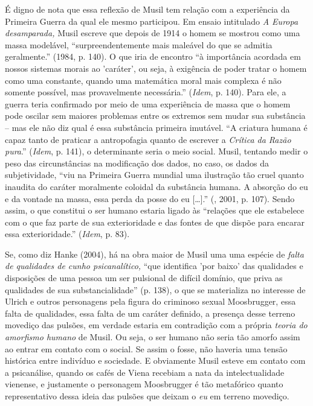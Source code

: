É digno de nota que essa reflexão de Musil tem relação com a experiência
da Primeira Guerra da qual ele mesmo participou. Em ensaio intitulado
\emph{A Europa desamparada,} Musil escreve que depois de 1914 o homem se
mostrou como uma massa modelável, ``surpreendentemente mais maleável do
que se admitia geralmente.'' (1984, p. 140). O que iria de encontro ``à
importância acordada em nossos sistemas morais ao 'caráter', ou seja, à
exigência de poder tratar o homem como uma constante, quando uma
matemática moral mais complexa é não somente possível, mas provavelmente
necessária.'' (\emph{Idem}, p. 140). Para ele, a guerra teria confirmado
por meio de uma experiência de massa que o homem pode oscilar sem
maiores problemas entre os extremos sem mudar sua substância -- mas ele
não diz qual é essa substância primeira imutável. ``A criatura humana é
capaz tanto de praticar a antropofagia quanto de escrever a
\emph{Crítica da Razão pura}.'' (\emph{Idem}, p. 141), o determinante
seria o meio social. Musil, tentando medir o peso das circunstâncias na
modificação dos dados, no caso, os dados da subjetividade, ``viu na
Primeira Guerra mundial uma ilustração tão cruel quanto inaudita do
caráter moralmente coloidal da substância humana. A absorção do eu e da
vontade na massa, essa perda da posse do eu [\ldots{}].'' (,
2001, p. 107). Sendo assim, o que constitui o ser humano estaria ligado
às ``relações que ele estabelece com o que faz parte de sua
exterioridade e das fontes de que dispõe para encarar essa
exterioridade.'' (\emph{Idem}, p. 83).

Se, como diz Hanke (2004), há na obra maior de Musil uma uma espécie de
\emph{falta de qualidades de cunho psicanalítico,} ``que identifica 'por
baixo' das qualidades e disposições de uma pessoa um ser pulsional de
difícil domínio, que priva as qualidades de sua substancialidade'' (p.
138), o que se materializa no interesse de Ulrich e outros personagens
pela figura do criminoso sexual Moosbrugger, essa falta de qualidades,
essa falta de um caráter definido, a presença desse terreno movediço das
pulsões, em verdade estaria em contradição com a própria \emph{teoria do
amorfismo humano} de Musil. Ou seja, o ser humano não seria tão amorfo
assim ao entrar em contato com o social. Se assim o fosse, não haveria
uma tensão histórica entre indivíduo e sociedade. E obviamente Musil
esteve em contato com a psicanálise, quando os cafés de Viena recebiam a
nata da intelectualidade vienense, e justamente o personagem Moosbrugger
é tão metafórico quanto representativo dessa ideia das pulsões que
deixam o \emph{eu} em terreno movediço.

